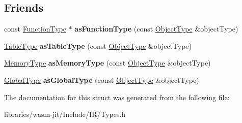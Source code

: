 \subsection*{Friends}
\begin{DoxyCompactItemize}
\item 
\mbox{\label{struct_i_r_1_1_object_type_a2c77989aa330689c9aca0ff8a7e77f7b}} 
const \mbox{\hyperlink{struct_i_r_1_1_function_type}{Function\+Type}} $\ast$ {\bfseries as\+Function\+Type} (const \mbox{\hyperlink{struct_i_r_1_1_object_type}{Object\+Type}} \&object\+Type)
\item 
\mbox{\label{struct_i_r_1_1_object_type_aed18736714cf34598af255edfdec00c8}} 
\mbox{\hyperlink{struct_i_r_1_1_table_type}{Table\+Type}} {\bfseries as\+Table\+Type} (const \mbox{\hyperlink{struct_i_r_1_1_object_type}{Object\+Type}} \&object\+Type)
\item 
\mbox{\label{struct_i_r_1_1_object_type_ad621775b7661c67ed084963e6811a920}} 
\mbox{\hyperlink{struct_i_r_1_1_memory_type}{Memory\+Type}} {\bfseries as\+Memory\+Type} (const \mbox{\hyperlink{struct_i_r_1_1_object_type}{Object\+Type}} \&object\+Type)
\item 
\mbox{\label{struct_i_r_1_1_object_type_a4f8585658033b8a7db470c9176984326}} 
\mbox{\hyperlink{struct_i_r_1_1_global_type}{Global\+Type}} {\bfseries as\+Global\+Type} (const \mbox{\hyperlink{struct_i_r_1_1_object_type}{Object\+Type}} \&object\+Type)
\end{DoxyCompactItemize}


The documentation for this struct was generated from the following file\+:\begin{DoxyCompactItemize}
\item 
libraries/wasm-\/jit/\+Include/\+I\+R/Types.\+h\end{DoxyCompactItemize}
